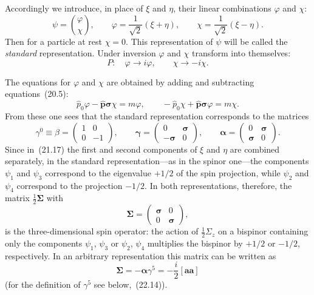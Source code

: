 Accordingly we introduce, in place of $\xi$ and $\eta$, their linear combinations $\varphi$ and $\chi$:
\begin{equation}
\psi = \binom{\varphi}{\chi},\qquad \varphi = \frac{1}{\sqrt2}(\xi+\eta),\qquad \chi = \frac{1}{\sqrt2}(\xi-\eta).
\tag{21.17}
\end{equation}
Then for a particle at rest $\chi = 0$. This representation of $\psi$ will be called the \emph{standard} representation. Under inversion $\varphi$ and $\chi$ transform into themselves:
\begin{equation}
P:\quad \varphi \to i\varphi,\qquad \chi \to -i\chi.
\tag{21.18}
\end{equation}

The equations for $\varphi$ and $\chi$ are obtained by adding and subtracting equations~(20.5):
\begin{equation}
\widehat p_0\varphi - \widehat{\mathbf{p}}\boldsymbol{\sigma}\chi = m\varphi,\qquad -\widehat p_0\chi + \widehat{\mathbf{p}}\boldsymbol{\sigma}\varphi = m\chi.
\tag{21.19}
\end{equation}
From these one sees that the standard representation corresponds to the matrices
\begin{equation}
\gamma^0 \equiv \beta = \begin{pmatrix} 1 & 0\\ 0 & -1 \end{pmatrix},\qquad \boldsymbol{\gamma} = \begin{pmatrix} 0 & \boldsymbol{\sigma}\\ -\boldsymbol{\sigma} & 0 \end{pmatrix},\qquad \boldsymbol{\alpha} = \begin{pmatrix} 0 & \boldsymbol{\sigma}\\ \boldsymbol{\sigma} & 0 \end{pmatrix}.
\tag{21.20}
\end{equation}
Since in~(21.17) the first and second components of $\xi$ and $\eta$ are combined separately, in the standard representation---as in the spinor one---the components $\psi_1$ and $\psi_3$ correspond to the eigenvalue $+1/2$ of the spin projection, while $\psi_2$ and $\psi_4$ correspond to the projection $-1/2$. In both representations, therefore, the matrix $\tfrac{1}{2}\boldsymbol{\Sigma}$ with
\begin{equation}
\boldsymbol{\Sigma} = \begin{pmatrix} \boldsymbol{\sigma} & 0\\ 0 & \boldsymbol{\sigma} \end{pmatrix},
\tag{21.21}
\end{equation}
is the three-dimensional spin operator: the action of $\tfrac{1}{2}\Sigma_z$ on a bispinor containing only the components $\psi_1$, $\psi_3$ or $\psi_2$, $\psi_4$ multiplies the bispinor by $+1/2$ or $-1/2$, respectively. In an arbitrary representation this matrix can be written as
\begin{equation}
\boldsymbol{\Sigma} = -\boldsymbol{\alpha}\gamma^5 = -\frac{i}{2}[\mathbf{a}\mathbf{a}]
\tag{21.22}
\end{equation}
(for the definition of $\gamma^5$ see below,~(22.14)).

